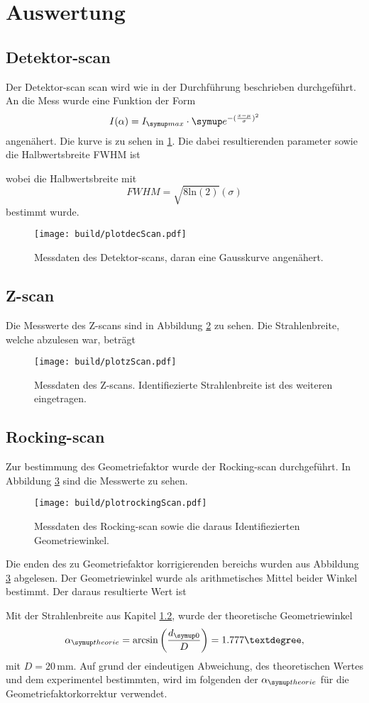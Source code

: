 \section{Auswertung}
\subsection{Detektor-scan}
Der Detektor-scan scan wird wie in der Durchführung beschrieben durchgeführt. An die Mess wurde eine Funktion der Form 
\begin{equation}
    I(\alpha)= I\idx{max}\cdot \e^{-(\frac{x-\mu}{\sigma})^2}
\end{equation}
angenähert. Die kurve is zu sehen in \ref{fig:decscan}. Die dabei resultierenden parameter sowie die Halbwertsbreite FWHM ist

wobei die Halbwertsbreite mit 
\begin{equation}
    FWHM = \sqrt{8 \text{ln}(2)}(\sigma)
\end{equation}
bestimmt wurde.
\begin{figure}
    \centering
    \texttt{[image: build/plotdecScan.pdf]}
    \caption{Messdaten des Detektor-scans, daran eine Gausskurve angenähert.}
    \label{fig:decscan}
\end{figure}
\subsection{Z-scan}
\label{chap:zscan}
Die Messwerte des Z-scans sind in Abbildung \ref{fig:zscan} zu sehen. Die Strahlenbreite, welche abzulesen war, beträgt

\begin{figure}
    \centering
    \texttt{[image: build/plotzScan.pdf]}
    \caption{Messdaten des Z-scans. Identifiezierte Strahlenbreite ist des weiteren eingetragen.}
    \label{fig:zscan}
\end{figure}
\subsection{Rocking-scan}
Zur bestimmung des Geometriefaktor wurde der Rocking-scan durchgeführt. In Abbildung \ref{fig:rocking} sind die Messwerte zu sehen.
\begin{figure}
    \centering
    \texttt{[image: build/plotrockingScan.pdf]}
    \caption{Messdaten des Rocking-scan sowie die daraus Identifiezierten Geometriewinkel.}
    \label{fig:rocking}
\end{figure}
Die enden des zu Geometriefaktor korrigierenden bereichs wurden aus Abbildung \ref{fig:rocking} abgelesen. Der Geometriewinkel wurde als
arithmetisches Mittel beider Winkel bestimmt. Der daraus resultierte Wert ist

Mit der Strahlenbreite aus Kapitel \ref{chap:zscan}, wurde der theoretische Geometriewinkel 
\begin{equation}
    \alpha\idx{theorie} = \text{arcsin}\left(\frac{d\idx{0}}{D}\right) = 1.777°,
\end{equation}
mit $D=20\,\si{\milli\meter}$. Auf grund der eindeutigen Abweichung, des theoretischen Wertes und dem experimentel bestimmten, wird im folgenden
der $\alpha\idx{theorie}$ für die Geometriefaktorkorrektur verwendet.
